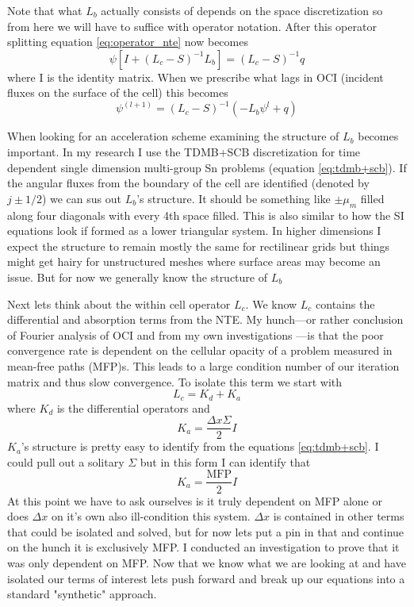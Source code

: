 Note that what $L_b$ actually consists of depends on the space discretization so from here we will have to suffice with operator notation.
After this operator splitting equation \ref{eq:operator_nte} now becomes
\begin{equation}
    \psi[I+(L_c-S)^{-1}L_b] = (L_c-S)^{-1}q
\end{equation}
where I is the identity matrix.
When we prescribe what lags in OCI (incident fluxes on the surface of the cell) this becomes
\begin{equation}
    \label{eq:itter}
    \psi^{(l+1)} = (L_c-S)^{-1}(-L_b\psi^l+q)
\end{equation}

When looking for an acceleration scheme examining the structure of $L_b$ becomes important.
In my research I use the TDMB+SCB discretization for time dependent single dimension multi-group Sn problems (equation \ref{eq:tdmb+scb}).
If the angular fluxes from the boundary of the cell are identified (denoted by $j\pm1/2$) we can sus out $L_b$'s structure.
It should be something like $\pm\mu_m$ filled along four diagonals with every 4th space filled.
This is also similar to how the SI equations look if formed as a lower triangular system.
In higher dimensions I expect the structure to remain mostly the same for rectilinear grids but things might get hairy for unstructured meshes where surface areas may become an issue.
But for now we generally know the structure of $L_b$

Next lets think about the within cell operator $L_c$.
We know $L_c$ contains the differential and absorption terms from the NTE.
My hunch---or rather conclusion of Fourier analysis of OCI \cite{rosa_cellwise_2013} and from my own investigations \cite{morgan2023oci}---is that the poor convergence rate is dependent on the cellular opacity of a problem measured in mean-free paths (MFP)s.
This leads to a large condition number of our iteration matrix and thus slow convergence.
To isolate this term we start with
\begin{equation}
    L_c = K_d + K_a
\end{equation}
where $K_d$ is the differential operators and
\begin{equation}
    K_a = \frac{\Delta x \Sigma}{2}  I
\end{equation}
$K_a$'s structure is pretty easy to identify from the equations \ref{eq:tdmb+scb}.
I could pull out a solitary $\Sigma$ but in this form I can identify that 
\begin{equation}
    K_a = \frac{\text{MFP}}{2}  I
\end{equation}
At this point we have to ask ourselves is it truly dependent on MFP alone or does $\Delta x$ on it's own also ill-condition this system.
$\Delta x$ is contained in other terms that could be isolated and solved, but for now lets put a pin in that and continue on the hunch it is exclusively MFP.
I conducted an investigation to prove that it was only dependent on MFP.
Now that we know what we are looking at and have isolated our terms of interest lets push forward and break up our equations into a standard "synthetic" approach.

